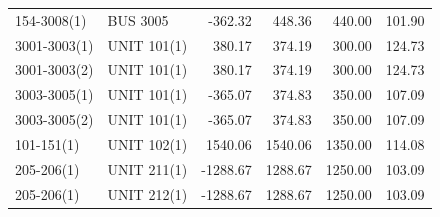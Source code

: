 \documentclass[10pt]{report}
\begin{document}
\begin{table}[H]
{\begin{tabular}{llrrrr}
154-3008(1) & BUS 3005 & -362.32 & 448.36 & 440.00 & 101.90 \\
3001-3003(1) & UNIT 101(1) & 380.17 & 374.19 & 300.00 & 124.73 \\
3001-3003(2) & UNIT 101(1) & 380.17 & 374.19 & 300.00 & 124.73 \\
3003-3005(1) & UNIT 101(1) & -365.07 & 374.83 & 350.00 & 107.09 \\
3003-3005(2) & UNIT 101(1) & -365.07 & 374.83 & 350.00 & 107.09 \\
101-151(1) & UNIT 102(1) & 1540.06 & 1540.06 & 1350.00 & 114.08 \\
205-206(1) & UNIT 211(1) & -1288.67 & 1288.67 & 1250.00 & 103.09 \\
205-206(1) & UNIT 212(1) & -1288.67 & 1288.67 & 1250.00 & 103.09 \\
\bottomrule
\end{tabular}}
\end{table}
\end{document}

